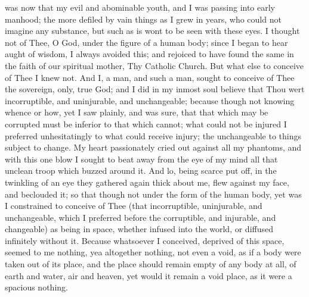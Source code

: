 \documentclass[b5paper,openright,12pt,twoside]{book}
\begin{document}
 was now that my evil and abominable youth, and I was passing
into early manhood; the more defiled by vain things as I grew in years,
who could not imagine any substance, but such as is wont to be seen with
these eyes. I thought not of Thee, O God, under the figure of a human
body; since I began to hear aught of wisdom, I always avoided this; and
rejoiced to have found the same in the faith of our spiritual mother,
Thy Catholic Church. But what else to conceive of Thee I knew not. And
I, a man, and such a man, sought to conceive of Thee the sovereign,
only, true God; and I did in my inmost soul believe that Thou wert
incorruptible, and uninjurable, and unchangeable; because though not
knowing whence or how, yet I saw plainly, and was sure, that that which
may be corrupted must be inferior to that which cannot; what could not
be injured I preferred unhesitatingly to what could receive injury; the
unchangeable to things subject to change. My heart passionately cried
out against all my phantoms, and with this one blow I sought to beat
away from the eye of my mind all that unclean troop which buzzed around
it. And lo, being scarce put off, in the twinkling of an eye they
gathered again thick about me, flew against my face, and beclouded
it; so that though not under the form of the human body, yet was I
constrained to conceive of Thee (that incorruptible, uninjurable, and
unchangeable, which I preferred before the corruptible, and injurable,
and changeable) as being in space, whether infused into the world, or
diffused infinitely without it. Because whatsoever I conceived, deprived
of this space, seemed to me nothing, yea altogether nothing, not even
a void, as if a body were taken out of its place, and the place should
remain empty of any body at all, of earth and water, air and heaven, yet
would it remain a void place, as it were a spacious nothing.
\end{document}
